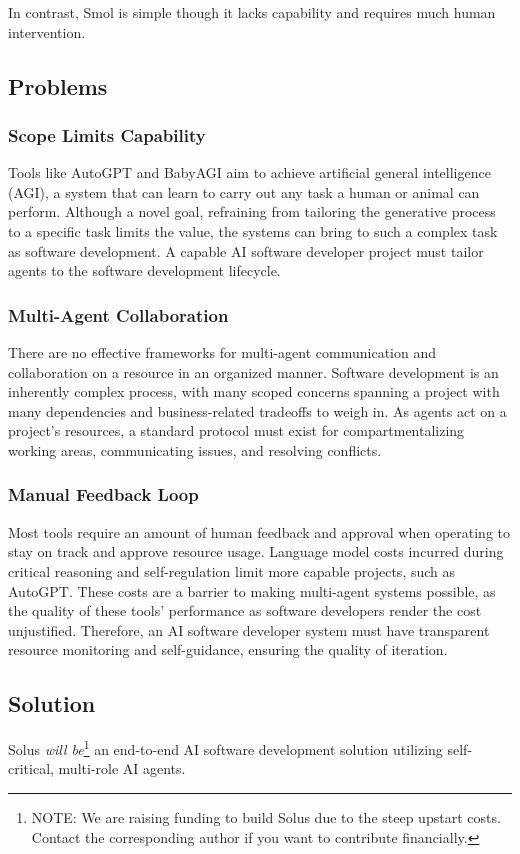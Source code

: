 \documentclass[a4paper,twocolumn,11pt]{quantumarticle}
\begin{document}
In contrast, Smol is simple though it lacks capability and requires much human intervention.

\subsection{Problems}
\subsubsection{Scope Limits Capability}
Tools like AutoGPT and BabyAGI aim to achieve artificial general intelligence (AGI), a system that can learn to carry out any task a human or animal can perform\cite{Bubeck2023Sparks}. Although a novel goal, refraining from tailoring the generative process to a specific task limits the value, the systems can bring to such a complex task as software development. A capable AI software developer project must tailor agents to the software development lifecycle.

\subsubsection{Multi-Agent Collaboration}
There are no effective frameworks for multi-agent communication and
collaboration on a resource in an organized manner. Software development is an
inherently complex process, with many scoped concerns spanning a project with
many dependencies and business-related tradeoffs to weigh in. As agents act on a
project's resources, a standard protocol must exist for compartmentalizing
working areas, communicating issues, and resolving conflicts.

\subsubsection{Manual Feedback Loop}
Most tools require an amount of human feedback and approval when operating to
stay on track and approve resource usage. Language model costs incurred during
critical reasoning and self-regulation limit more capable projects, such as
AutoGPT. These costs are a barrier to making multi-agent systems possible, as the
quality of these tools' performance as software developers render the cost
unjustified. Therefore, an AI software developer system must have transparent
resource monitoring and self-guidance, ensuring the quality of iteration.

\subsection{Solution}
Solus \textit{will be}\footnote{NOTE: We are raising funding to build Solus due to the steep upstart costs. Contact the corresponding author if you want to contribute financially.} an end-to-end AI software development solution utilizing self-critical, multi-role AI agents.
\end{document}
